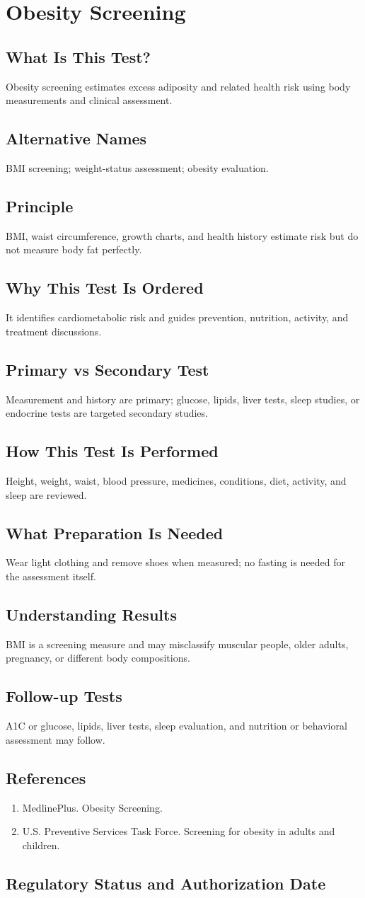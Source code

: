 \chapter{Obesity Screening}
\section*{What Is This Test?} Obesity screening estimates excess adiposity and related health risk using body measurements and clinical assessment.\section*{Alternative Names} BMI screening; weight-status assessment; obesity evaluation.\section*{Principle} BMI, waist circumference, growth charts, and health history estimate risk but do not measure body fat perfectly.\section*{Why This Test Is Ordered} It identifies cardiometabolic risk and guides prevention, nutrition, activity, and treatment discussions.\section*{Primary vs Secondary Test} Measurement and history are primary; glucose, lipids, liver tests, sleep studies, or endocrine tests are targeted secondary studies.\section*{How This Test Is Performed} Height, weight, waist, blood pressure, medicines, conditions, diet, activity, and sleep are reviewed.\section*{What Preparation Is Needed} Wear light clothing and remove shoes when measured; no fasting is needed for the assessment itself.\section*{Understanding Results} BMI is a screening measure and may misclassify muscular people, older adults, pregnancy, or different body compositions.\section*{Follow-up Tests} A1C or glucose, lipids, liver tests, sleep evaluation, and nutrition or behavioral assessment may follow.\section*{References} \begin{enumerate}\item MedlinePlus. Obesity Screening.\item U.S. Preventive Services Task Force. Screening for obesity in adults and children.\end{enumerate}\clearpage\section*{Regulatory Status and Authorization Date}\clearpage
